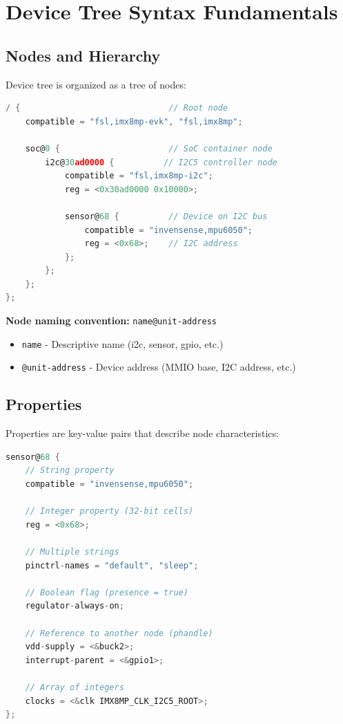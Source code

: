 \documentclass[12pt,a4paper]{report}
\begin{document}
\section{Device Tree Syntax Fundamentals}

\subsection{Nodes and Hierarchy}

Device tree is organized as a tree of nodes:

\begin{lstlisting}[language=c]
/ {                              // Root node
    compatible = "fsl,imx8mp-evk", "fsl,imx8mp";
    
    soc@0 {                      // SoC container node
        i2c@30ad0000 {          // I2C5 controller node
            compatible = "fsl,imx8mp-i2c";
            reg = <0x30ad0000 0x10000>;
            
            sensor@68 {          // Device on I2C bus
                compatible = "invensense,mpu6050";
                reg = <0x68>;    // I2C address
            };
        };
    };
};
\end{lstlisting}

\textbf{Node naming convention:} \texttt{name@unit-address}
\begin{itemize}
    \item \texttt{name} - Descriptive name (i2c, sensor, gpio, etc.)
    \item \texttt{@unit-address} - Device address (MMIO base, I2C address, etc.)
\end{itemize}

\subsection{Properties}

Properties are key-value pairs that describe node characteristics:

\begin{lstlisting}[language=c]
sensor@68 {
    // String property
    compatible = "invensense,mpu6050";
    
    // Integer property (32-bit cells)
    reg = <0x68>;
    
    // Multiple strings
    pinctrl-names = "default", "sleep";
    
    // Boolean flag (presence = true)
    regulator-always-on;
    
    // Reference to another node (phandle)
    vdd-supply = <&buck2>;
    interrupt-parent = <&gpio1>;
    
    // Array of integers
    clocks = <&clk IMX8MP_CLK_I2C5_ROOT>;
};
\end{lstlisting}
\end{document}
